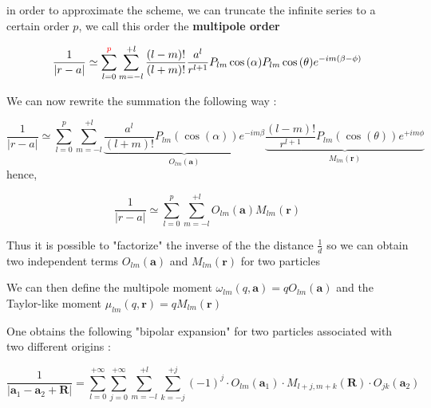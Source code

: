 \documentclass[10pt,twoside,a4paper]{report}
\begin{document}
	in order to approximate the scheme, we can truncate the infinite series to a certain order $p$, we call this order the \textbf{multipole order}
	
	\begin{equation}	
	\frac{1}{|r - a|} \simeq \sum\limits_{l=0}^{\textcolor{red}{p}} \sum\limits_{m = -l}^{+l} \frac{(l-m)!}{(l+m)!} \frac{a^l}{r^{l+1}} P_{lm}\cos{(\alpha)}P_{lm}\cos{(\theta)}e^{-im(\beta - \phi)}
	\label{eq:order}
	\end{equation}
	
	We can now rewrite the summation the following way :
	
		\begin{equation}
	\frac{1}{|r - a|} \simeq \sum\limits_{l=0}^{p} \sum\limits_{m = -l}^{+l}
	\underbrace{\frac{a^l}{(l+m)!} P_{lm}(\cos(\alpha))e^{-im\beta}} _{O_{lm}(\textbf{a})}
    \underbrace{\frac{(l-m)!}{r^{l+1}} P_{lm}(\cos(\theta))e^{+im\phi}} _{M_{lm}(\textbf{r})}
	\end{equation}
	hence,
	
		\begin{equation}
	\frac{1}{|r - a|} \simeq \sum\limits_{l=0}^{p} \sum\limits_{m = -l}^{+l}
	{O_{lm}(\textbf{a})}
    {M_{lm}(\textbf{r})}
	\end{equation}
	
	
	Thus it is possible to "factorize" the inverse of the the distance $\frac{1}{d}$ so we can obtain two independent terms ${O_{lm}(\textbf{a})}$ and ${M_{lm}(\textbf{r})}$  for two particles 


	We can then define the multipole moment $\omega_{lm}(q,\textbf{a}) = q O_{lm}(\textbf{a})$ and the Taylor-like moment $\mu_{lm}(q,\textbf{r}) = q M_{lm}(\textbf{r})$
	
	One obtains the following "bipolar expansion" for two particles associated with two different origins :
	
    \begin{equation}
    \frac{1}{|\textbf{a}_1 - \textbf{a}_2 + \textbf{R}|} = 
    \sum\limits_{l=0}^{+\infty}
    \sum\limits_{j=0}^{+\infty}
    \sum\limits_{m=-l}^{+l}
    \sum\limits_{k=-j}^{+j}
    (-1)^j \cdot O_{lm}(\textbf{a}_1) \cdot M_{l+j,m+k}(\textbf{R}) \cdot O_{jk}(\textbf{a}_2)
    \end{equation}
\end{document}

